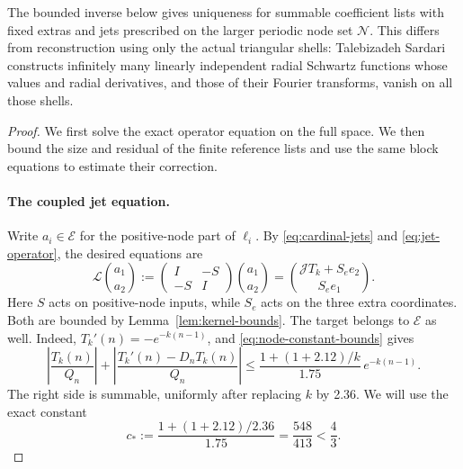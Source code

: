 The bounded inverse below gives uniqueness for summable coefficient lists
with fixed extras and jets prescribed on the larger periodic node set
\(\mathcal N\).  This differs from reconstruction using only the actual
triangular shells: Talebizadeh Sardari~\citep[Theorem~1.7]{Sardari2021} constructs infinitely many
linearly independent radial Schwartz functions whose values and radial
derivatives, and those of their Fourier transforms, vanish on all those
shells.

\begin{proof}
We first solve the exact operator equation on the full space.  We then bound
the size and residual of the finite reference lists and use the same block
equations to estimate their correction.

\paragraph{The coupled jet equation.}
Write \(a_i\in\mathcal E\) for the positive-node part of \(\ell_i\).  By
\eqref{eq:cardinal-jets} and \eqref{eq:jet-operator}, the desired equations are
\begin{equation}
 \mathcal L\binom{a_1}{a_2}
 :=\begin{pmatrix}I&-S\\-S&I\end{pmatrix}\binom{a_1}{a_2}
 =\binom{\mathcal JT_k+S_e e_2}{S_e e_1}.
 \label{eq:infinite-interpolation-system}
\end{equation}
Here \(S\) acts on positive-node inputs, while \(S_e\) acts on the three
extra coordinates.  Both are bounded by Lemma~\ref{lem:kernel-bounds}.  The
target belongs to \(\mathcal E\) as well.  Indeed,
\(T_k'(n)=-e^{-k(n-1)}\), and \eqref{eq:node-constant-bounds} gives
\begin{equation}
 \left|\frac{T_k(n)}{Q_n}\right|
 +\left|\frac{T_k'(n)-D_nT_k(n)}{Q_n}\right|
 \le\frac{1+(1+2.12)/k}{1.75}\,e^{-k(n-1)}.
 \label{eq:target-jet-bound}
\end{equation}
The right side is summable, uniformly after replacing \(k\) by 2.36.  We
will use the exact constant
\[
 c_*:=\frac{1+(1+2.12)/2.36}{1.75}=\frac{548}{413}<\frac43.
\]


\end{proof}
